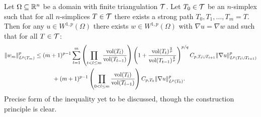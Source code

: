 \documentclass[a4paper]{article}
\begin{document}
\begin{theorem}\label{theorem:poincarefriedrichsestimate:grad}
    Let $\Omega \subseteq {\mathbb R}^{n}$ be a domain with finite triangulation ${\mathcal T}$.
    Let $T_0 \in {\mathcal T}$ be an $n$-simplex such that for all $n$-simplices $T \in {\mathcal T}$ 
    there exists a strong path $T_0, T_1, \dots, T_m = T$.
    Then for any $u \in W^{1,p}(\Omega)$ 
    there exists $w \in W^{1,p}(\Omega)$ with $\nabla u = \nabla w$ 
    and such that for all $T \in {\mathcal T}$:
    \begin{align*}
        \| w_{m} \|_{L^{p}(T_m)}^{p}
        &\leq 
        (m+1)^{p-1}
        \sum_{t=1}^{m} 
        \left( 
            \prod_{t < l \leq m} 
            \frac{ \operatorname{vol}(T_l) }{ \operatorname{vol}(T_{l-1}) } 
        \right)
        \left( 1 + \frac{ \operatorname{vol}(T_t)^{\frac q p} }{ \operatorname{vol}(T_{t-1})^{\frac q p} } \right)^{p/q}
        C_{p,T_{t} \cup T_{t+1}}
        \| \nabla u \|_{L^{p}( T_{t} \cup T_{t+1} )}^{p}
        \\&\quad \quad \quad 
        +
        (m+1)^{p-1}
        \left( 
            \prod_{0 < l \leq m} 
            \frac{ \operatorname{vol}(T_l) }{ \operatorname{vol}(T_{l-1}) } 
        \right)
        C_{p,T_{0}}
        \| \nabla u \|_{L^{p}(T_{0})}^{p}
        .
    \end{align*}
    \color{red}Precise form of the inequality yet to be discussed, though the construction principle is clear.
\end{theorem}
\end{document}
